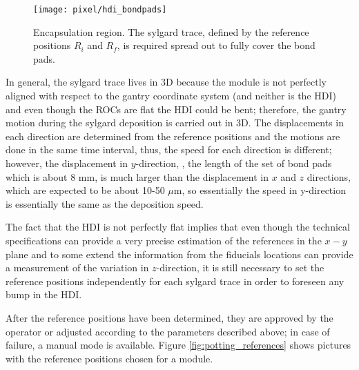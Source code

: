 \begin{figure}[h]
\centering
  \texttt{[image: pixel/hdi\_bondpads]}
 \caption[Encapsulation region.]{Encapsulation region. The sylgard trace, defined by the reference positions $R_i$ and $R_f$, is required spread out to fully cover the bond pads. }\label{fig:hdi_bondpads}
\end{figure}

In general, the sylgard trace lives in 3D because the module is not perfectly aligned with respect to the gantry coordinate system (and neither is the HDI) and even though the ROCs are flat the HDI could be bent; therefore, the gantry motion during the sylgard deposition is carried out in 3D. The displacements in each direction are determined from the reference positions and the motions are done in the same time interval, thus, the speed for each direction is different; however, the displacement in $y$-direction, \ie, the length of the set of bond pads which is about 8 mm, is much larger than the displacement in $x$ and $z$ directions, which are expected to be about 10-50 $\mu$m, so essentially the speed in y-direction is essentially the same as the deposition speed.

The fact that the HDI is not perfectly flat implies that even though the technical specifications can provide a very precise estimation of the references in the $x-y$ plane and to some extend the information from the fiducials locations can provide a measurement of the variation in $z$-direction, it is still necessary to set the reference positions independently for each sylgard trace in order to foreseen any bump in the HDI.

After the reference positions have been determined, they are approved by the operator or adjusted according to the parameters described above; in case of failure, a manual mode is available. Figure \ref{fig:potting_references} shows pictures with the reference positions chosen for a module.        

